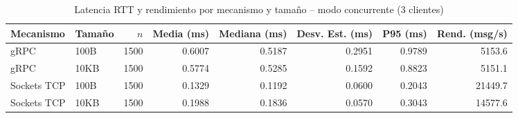 \begin{table}[htbp]
\centering
\caption{Latencia RTT y rendimiento por mecanismo y tamaño -- modo concurrente (3 clientes)}
\label{tab:latencias_concurrent}
\small
\begin{tabular}{llrrrrrr}
\toprule
Mecanismo & Tamaño & $n$ & Media (ms) & Mediana (ms) & Desv. Est. (ms) & P95 (ms) & Rend. (msg/s) \\
\midrule
gRPC & 100B & 1500 & 0.6007 & 0.5187 & 0.2951 & 0.9789 & 5153.6 \\
gRPC & 10KB & 1500 & 0.5774 & 0.5285 & 0.1592 & 0.8823 & 5151.1 \\
Sockets TCP & 100B & 1500 & 0.1329 & 0.1192 & 0.0600 & 0.2043 & 21449.7 \\
Sockets TCP & 10KB & 1500 & 0.1988 & 0.1836 & 0.0570 & 0.3043 & 14577.6 \\
\bottomrule
\end{tabular}
\end{table}
